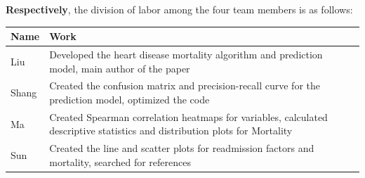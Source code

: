 \documentclass[13pt]{ctexart}
\begin{document}
\textbf{Respectively}, the division of labor among the four team members is as follows:
\begin{table}[h]
	\centering
	\vspace{3pt}
	\begin{tabular}{>{\centering\arraybackslash}p{5em}>{\centering\arraybackslash}p{30em}}
	\toprule
	Name & Work \\ \midrule
    Liu & Developed the heart disease mortality algorithm and prediction model, main author of the paper\\
    Shang & Created the confusion matrix and precision-recall curve for the prediction model, optimized the code\\
    Ma & Created Spearman correlation heatmaps for variables, calculated descriptive statistics and distribution plots for Mortality\\
    Sun & Created the line and scatter plots for readmission factors and mortality, searched for references\\
	\bottomrule
	\end{tabular}
\end{table}
\end{document}
